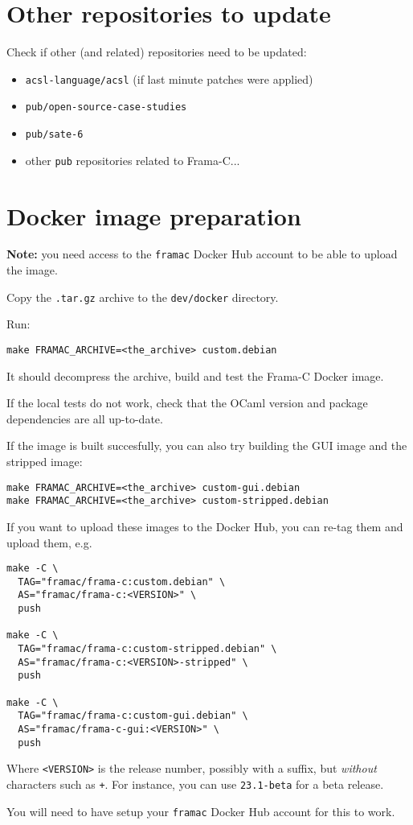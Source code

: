 \section{Other repositories to update}

Check if other \FramaC (and related) repositories need to be updated:

\begin{itemize}
\item \texttt{acsl-language/acsl} (if last minute patches were applied)
\item \texttt{pub/open-source-case-studies}
\item \texttt{pub/sate-6}
\item other \texttt{pub} repositories related to Frama-C...
\end{itemize}

\section{Docker image preparation}

\textbf{Note:} you need access to the \texttt{framac} Docker Hub account to be
able to upload the image.

Copy the \texttt{.tar.gz} archive to the \texttt{dev/docker} directory.

Run:
\begin{lstlisting}
make FRAMAC_ARCHIVE=<the_archive> custom.debian
\end{lstlisting}
It should decompress the archive, build and test the Frama-C Docker image.

If the local tests do not work, check that the OCaml version and package
dependencies are all up-to-date.

If the image is built succesfully, you can also try building the GUI image and
the stripped image:
\begin{lstlisting}
make FRAMAC_ARCHIVE=<the_archive> custom-gui.debian
make FRAMAC_ARCHIVE=<the_archive> custom-stripped.debian
\end{lstlisting}

If you want to upload these images to the Docker Hub, you can re-tag them and
upload them, e.g.

\begin{lstlisting}
make -C \
  TAG="framac/frama-c:custom.debian" \
  AS="framac/frama-c:<VERSION>" \
  push

make -C \
  TAG="framac/frama-c:custom-stripped.debian" \
  AS="framac/frama-c:<VERSION>-stripped" \
  push

make -C \
  TAG="framac/frama-c:custom-gui.debian" \
  AS="framac/frama-c-gui:<VERSION>" \
  push
\end{lstlisting}

Where \texttt{<VERSION>} is the release number, possibly with a suffix, but
{\em without} characters such as \texttt{+}. For instance, you can use
\texttt{23.1-beta} for a beta release.

You will need to have setup your \texttt{framac} Docker Hub account for this to work.

